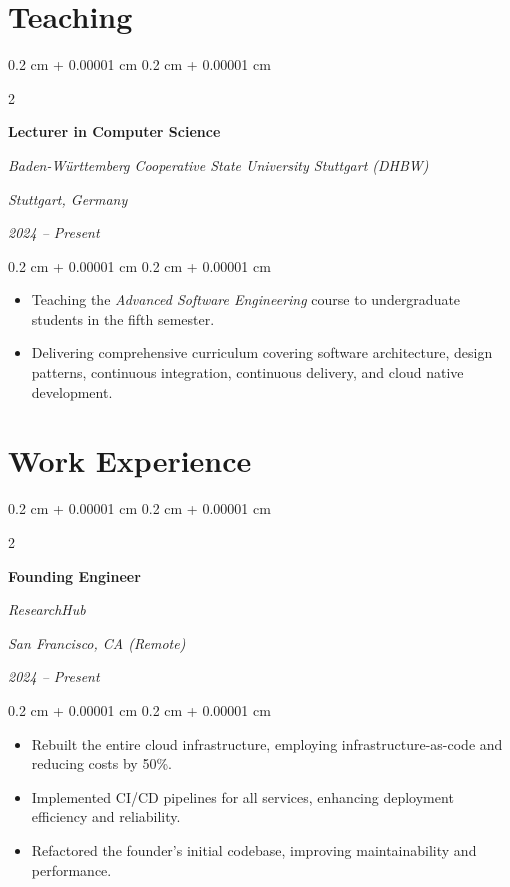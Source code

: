 \documentclass[10pt, a4paper]{article}
\newenvironment{highlights}{
    \begin{itemize}[
        topsep=0.10 cm,
        parsep=0.10 cm,
        partopsep=0pt,
        itemsep=0pt,
        leftmargin=0.4 cm + 10pt
    ]
}{
    \end{itemize}
} %
\newenvironment{onecolentry}{
    \begin{adjustwidth}{
        0.2 cm + 0.00001 cm
    }{
        0.2 cm + 0.00001 cm
    }
}{
    \end{adjustwidth}
} %
\newenvironment{twocolentry}[2][6cm]{ %
    \onecolentry
    \def\secondColumn{#2}
    \setcolumnwidth{\fill, #1} %
    \begin{paracol}{2}
}{
    \switchcolumn \raggedleft \secondColumn
    \end{paracol}
    \endonecolentry
} %
\begin{document}
\section{Teaching}
\begin{twocolentry}{
        \textit{Stuttgart, Germany}

        \textit{2024 – Present}}
    \textbf{Lecturer in Computer Science}

    \textit{Baden-Württemberg Cooperative State University Stuttgart (DHBW)}
\end{twocolentry}

\vspace{0.10 cm}
\begin{onecolentry}
    \begin{highlights}
        \item Teaching the \textit{Advanced Software Engineering} course to undergraduate students in the fifth semester.
        \item Delivering comprehensive curriculum covering software architecture, design patterns, continuous integration, continuous delivery, and cloud native development.
    \end{highlights}
\end{onecolentry}




\section{Work Experience}



%
%
\begin{twocolentry}{
        \textit{San Francisco, CA (Remote)}

        \textit{2024 – Present}}
    \textbf{Founding Engineer}

    \textit{ResearchHub}
\end{twocolentry}

\vspace{0.10 cm}
\begin{onecolentry}
    \begin{highlights}
        \item Rebuilt the entire cloud infrastructure, employing infrastructure-as-code and reducing costs by 50\%.
        \item Implemented CI/CD pipelines for all services, enhancing deployment efficiency and reliability.
        \item Refactored the founder's initial codebase, improving maintainability and performance.
    \end{highlights}
\end{onecolentry}
\end{document}
